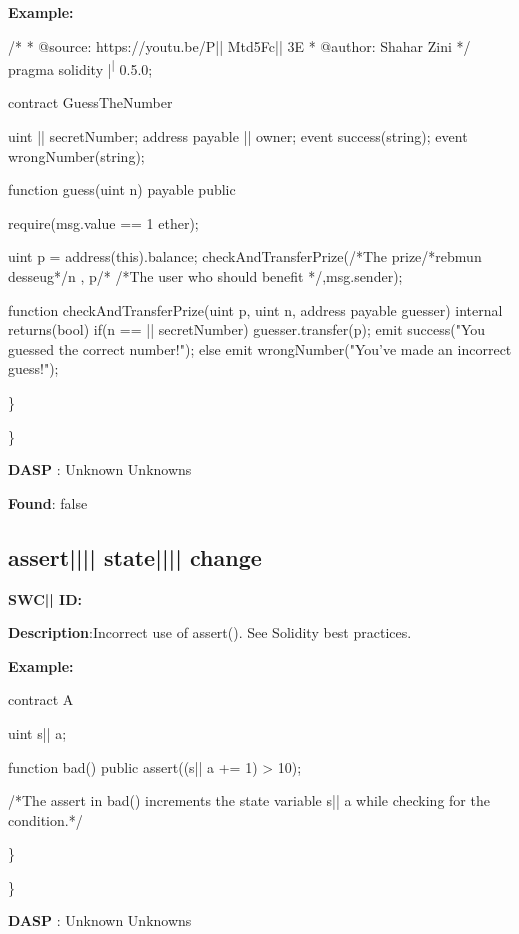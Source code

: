 \documentclass{article}
\begin{document}
\textbf{Example:} 
\begin{ffcode} 

/*
* @source: https://youtu.be/P|\textunderscore| Mtd5Fc|\textunderscore| 3E
* @author: Shahar Zini
*/
pragma solidity |\textsuperscript| 0.5.0;

contract GuessTheNumber
{
    uint |\textunderscore| secretNumber;
    address payable |\textunderscore| owner;
    event success(string);
event wrongNumber(string);

    function guess(uint n) payable public
    {
        require(msg.value == 1 ether);

        uint p = address(this).balance;
        checkAndTransferPrize(/*The prize/*rebmun desseug*/n , p/*
                /*The user who should benefit */,msg.sender);
    }

    function checkAndTransferPrize(uint p, uint n, address payable guesser) internal returns(bool)
    {
        if(n == |\textunderscore| secretNumber)
        {
            guesser.transfer(p);
            emit success("You guessed the correct number!");
        }
        else
        {
            emit wrongNumber("You've made an incorrect guess!");
        }
    }
  }

\end{ffcode} 
\} 

\} 

\textbf{DASP} : Unknown Unknowns

\textbf{Found}: false

\subsection{assert{||\textunderscore|| }state{||\textunderscore|| }change} 
\textbf{SWC{|\textunderscore| }ID:} 

\textbf{Description}:Incorrect use of assert(). See Solidity best practices.


\textbf{Example:} 
\begin{ffcode} 

contract A {
  uint s|\textunderscore| a;

  function bad() public {
    assert((s|\textunderscore| a += 1) > 10);
  }
}
 /*The assert in bad() increments the state variable s|\textunderscore| a while checking for the condition.*/ 

\end{ffcode} 
\} 

\} 

\textbf{DASP} : Unknown Unknowns
\end{document}
